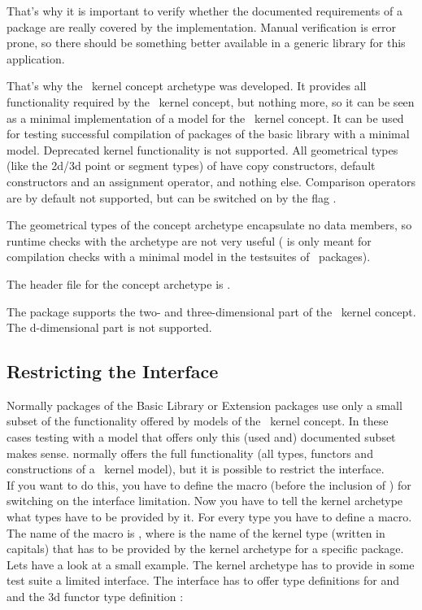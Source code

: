 That's why it is important to verify whether the documented requirements of a
package are really covered by the implementation. Manual verification is error
prone, so there should be something better available in a generic library for
this application.

That's why the \cgal\ kernel concept archetype  was
developed. It provides all functionality required by the \cgal\ kernel concept,
but nothing more, so it can be seen as a minimal implementation of a model for
the \cgal\ kernel concept.  It can be used for testing successful compilation of
packages of the basic library with a minimal model. Deprecated kernel
functionality is not supported. All geometrical types (like the 2d/3d point or
segment types) of  have copy constructors, default
constructors and an assignment operator, and nothing else.  Comparison
operators are by default not supported, but can be switched on by the flag .

The geometrical types of the concept archetype encapsulate no data members, so
runtime checks with the archetype are not very useful
( is only meant for compilation checks with a
minimal model in the testsuites of \cgal\ packages).

The header file for the concept archetype is .

The package supports the two- and three-dimensional part of the \cgal\ kernel
concept. The d-dimensional part is not supported.

\subsection{Restricting the Interface}

Normally packages of the Basic Library or Extension packages use only a small
subset of the functionality offered by models of the \cgal\ kernel concept. In
these cases testing with a model that offers only this (used and) documented
subset makes sense.  normally offers the full
functionality (all types, functors and constructions of a \cgal\ kernel model),
but it is possible to restrict the interface.\\ If you want to do this, you
have to define the macro  (before the
inclusion of ) for switching on the interface
limitation. Now you have to tell the kernel archetype what types have to be
provided by it. For every type you have to define a macro.  The name of the
macro is , where  is the name of the kernel type (written in capitals)
that has to be provided by the kernel archetype for a specific package.  Lets
have a look at a small example. The kernel archetype has to provide in some
test suite a limited interface.  The interface has to offer type definitions
for  and  and the 3d  functor type
definition :

